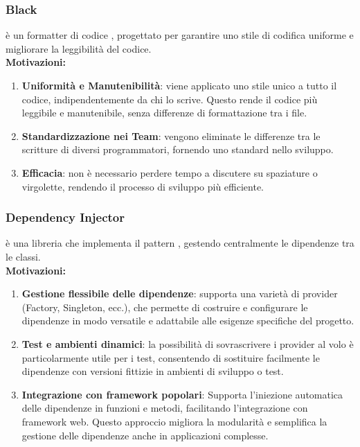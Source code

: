 \subsubsection{Black}
\label{subsubsec:Black}
 è un formatter di codice , progettato per garantire uno stile di codifica uniforme e migliorare la leggibilità del codice.\\  

\textbf{Motivazioni:}  

\begin{enumerate}
    \item \textbf{Uniformità e Manutenibilità}: viene applicato uno stile unico a tutto il codice, indipendentemente da chi lo scrive. Questo rende il codice più leggibile e manutenibile, senza differenze di formattazione tra i file.
    \item \textbf{Standardizzazione nei Team}: vengono eliminate le differenze tra le scritture di diversi programmatori, fornendo uno standard nello sviluppo.
    \item \textbf{Efficacia}: non è necessario perdere tempo a discutere su spaziature o virgolette, rendendo il processo di sviluppo più efficiente.
\end{enumerate}

\subsubsection{Dependency Injector}
\label{subsubsec:Dependency Injector}
  è una libreria  che implementa il pattern , gestendo centralmente le dipendenze tra le classi.\\  

\textbf{Motivazioni:}  

\begin{enumerate}
    \item \textbf{Gestione flessibile delle dipendenze}: supporta una varietà di provider (Factory, Singleton, ecc.), che permette di costruire e configurare le dipendenze in modo versatile e adattabile alle esigenze specifiche del progetto.
    \item \textbf{Test e ambienti dinamici}: la possibilità di sovrascrivere i provider al volo è particolarmente utile per i test, consentendo di sostituire facilmente le dipendenze con versioni fittizie in ambienti di sviluppo o test.
    \item \textbf{Integrazione con framework popolari}: Supporta l'iniezione automatica delle dipendenze in funzioni e metodi, facilitando l'integrazione con framework web. Questo approccio migliora la modularità e semplifica la gestione delle dipendenze anche in applicazioni complesse.
\end{enumerate}